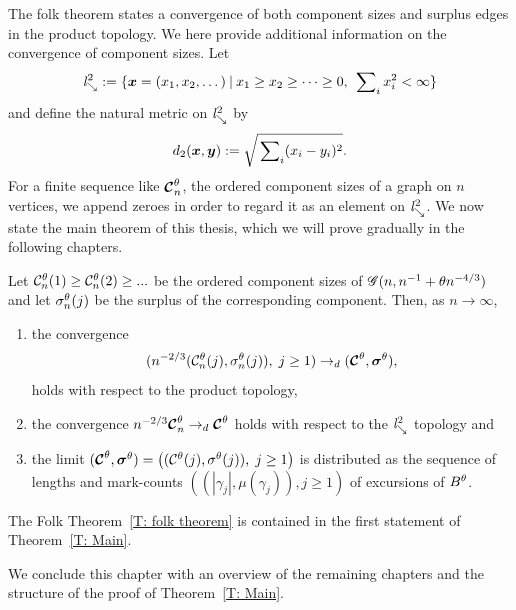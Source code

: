 The folk theorem states a convergence of both component sizes and surplus edges in the product topology.
We here provide additional information on the convergence of component sizes.
Let
\begin{equation} \label{D: ld}
	\mathit{l}^2_{\searrow} := \{ \boldsymbol{x} = (x_1, x_2, \dots) \: | \: x_1 \geq x_2 \geq \dots \geq 0, \; \sideset{}{_i}\sum x^2_i < \infty \}
\end{equation}
and define the natural metric on $\mathit{l}^2_{\searrow}$ by
\begin{equation}
	d_2(\boldsymbol{x},\boldsymbol{y}) := \sqrt{\sideset{}{_i}\sum (x_i - y_i)^2}.
\end{equation}
For a finite sequence like $\boldsymbol{\mathcal{C}}^{\theta}_n$, the ordered component sizes of a graph on $n$ vertices, we append zeroes in order to regard it as an element on $\mathit{l}^2_{\searrow}$.
We now state the main theorem of this thesis, which we will prove gradually in the following chapters.

\begin{theorem} \label{T: Main}
	Let $\mathcal{C}^{\theta}_n(1) \geq \mathcal{C}^{\theta}_n(2) \geq ... $ be the ordered component sizes of $\mathscr{G}(n, n^{-1} + \theta n^{-4/3})$
	and let $\mathcal{\sigma}^{\theta}_n(j)$ be the surplus of the corresponding component.
	Then, as $n \rightarrow \infty$,
	\begin{enumerate}
		\item the convergence
		\begin{equation*}
		( n^{-2 / 3} ( \mathcal{C}^{\theta}_n(j), \mathcal{\sigma}^{\theta}_n(j) ), \; j \geq 1 ) 
		\rightarrow_d
		( \boldsymbol{\mathcal{C}}^{\theta}, \boldsymbol{\mathcal{\sigma}}^{\theta} ),
		\end{equation*}
		holds with respect to the product topology,
		
		\item the convergence $n^{-2 / 3} \boldsymbol{\mathcal{C}}^{\theta}_n \rightarrow_d \boldsymbol{\mathcal{C}}^{\theta}$
		holds with respect to the $\mathit{l}^2_{\searrow}$ topology and
		
		\item the limit
		$( \boldsymbol{\mathcal{C}}^{\theta}, \boldsymbol{\mathcal{\sigma}}^{\theta} ) = \left( ( \mathcal{C}^{\theta}(j), \mathcal{\sigma}^{\theta}(j) ), \; j \geq 1 \right)$
		is distributed as the sequence of lengths and mark-counts
		$ \left( (|\gamma_j|, \mu(\gamma_j)), j \geq 1  \right) $
		of excursions of $B^{\theta}$.
	\end{enumerate}
\end{theorem}
\begin{note}
	The Folk Theorem~\ref{T: folk theorem} is contained in the first statement of Theorem~\ref{T: Main}.
\end{note}


We conclude this chapter with an overview of the remaining chapters and the structure of the proof of Theorem~\ref{T: Main}.


